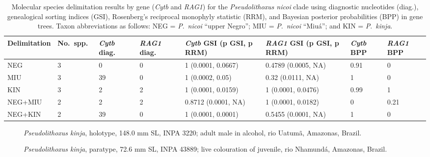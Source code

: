 \documentclass[12pt]{article}
\begin{document}
\newpage
\begin{table}[htbp]
\scriptsize
\caption{Molecular species delimitation results by gene (\emph{Cytb} and \emph{RAG1}) for the \emph{Pseudolithoxus nicoi} clade using diagnostic nucleotides (diag.), genealogical sorting indices (GSI), Rosenberg's reciprocal monophyly statistic (RRM), and Bayesian posterior probabilities (BPP) in gene trees. %
Taxon abbreviations as follows: NEG = \emph{P}.\ \emph{nicoi} ``upper Negro''; MIU = \emph{P}.\ \emph{nicoi} ``Miuá''; and KIN = \emph{P}.\ \emph{kinja}.}
\begin{tabular}{llllllll}
\toprule
Delimitation & No.\ spp.\ & \emph{Cytb} diag.\ & \emph{RAG1} diag.\ & \emph{Cytb} GSI (p GSI, p RRM) & \emph{RAG1} GSI (p GSI, p RRM) & \emph{Cytb} BPP & \emph{RAG1} BPP\\
\midrule
NEG	 & 3 & 0 & 0 & 1 (0.0001, 0.0667) & 0.4789 (0.0005, NA) & 0.91 & 0\\
MIU & 3 & 39 & 0 & 1 (0.0002, 0.05) & 0.32 (0.0111, NA) & 1 & 0\\
KIN & 3 & 2 & 2 & 1 (0.0001, 0.0159) & 1 (0.0001, 0.0476) & 0.99 & 1\\
NEG+MIU & 2 & 2 & 2 & 0.8712 (0.0001, NA) & 1 (0.0001, 0.0182) & 0 & 0.21\\
NEG+KIN & 2 & 39 & 0 & 1 (0.0001, 0.0001) & 0.5455 (0.0001, NA) & 1 & 0\\
\bottomrule
\end{tabular}
\label{tab:metrics}
\end{table}


\newpage

\begin{figure}[!htbp]
\caption{\emph{Pseudolithoxus kinja}, holotype, 148.0 mm SL, INPA 3220; adult male in alcohol, rio Uatumã, Amazonas, Brazil.}
\begin{center}
\end{center}
\label{fig:holotype}
\end{figure}

\begin{figure}[!htbp]
\caption{\emph{Pseudolithoxus kinja}, paratype, 72.6 mm SL, INPA 43889; live colouration of juvenile, rio Nhamundá, Amazonas, Brazil.}
\begin{center}
\end{center}
\label{fig:paratype}
\end{figure}
\end{document}

